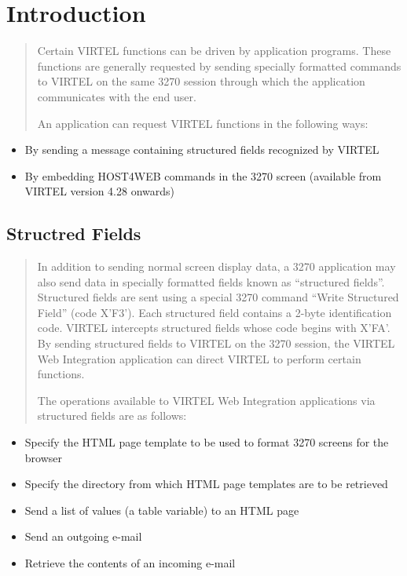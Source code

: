 \documentclass[letterpaper,10pt,english]{sphinxmanual}
\begin{document}
\section{Introduction}
\label{\detokenize{User_Guide:id9}}\begin{quote}

Certain VIRTEL functions can be driven by application programs.
These functions are generally requested by sending specially
formatted commands to VIRTEL on the same 3270 session through which
the application communicates with the end user.

An application can request VIRTEL functions in the following ways:
\end{quote}
\begin{itemize}
\item {} 
By sending a message containing structured fields recognized by
VIRTEL

\item {} 
By embedding HOST4WEB commands in the 3270 screen (available from
VIRTEL version 4.28 onwards)

\end{itemize}


\subsection{Structred Fields}
\label{\detokenize{User_Guide:structred-fields}}\begin{quote}

In addition to sending normal screen display data, a 3270
application may also send data in specially formatted fields known
as “structured fields”. Structured fields are sent using a special
3270 command “Write Structured Field” (code X’F3’). Each structured
field contains a 2-byte identification code. VIRTEL intercepts
structured fields whose code begins with X’FA’. By sending
structured fields to VIRTEL on the 3270 session, the VIRTEL Web
Integration application can direct VIRTEL to perform certain
functions.

The operations available to VIRTEL Web Integration applications via
structured fields are as follows:
\end{quote}
\begin{itemize}
\item {} 
Specify the HTML page template to be used to format 3270 screens for
the browser

\item {} 
Specify the directory from which HTML page templates are to be
retrieved

\item {} 
Send a list of values (a table variable) to an HTML page

\item {} 
Send an outgoing e-mail

\item {} 
Retrieve the contents of an incoming e-mail

\end{itemize}
\end{document}
